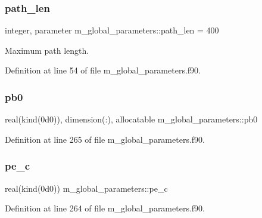 \mbox{\label{namespacem__global__parameters_aa9d578c318044b2f2ec990b5fc0dfab9}} 
\subsubsection{\texorpdfstring{path\+\_\+len}{path\_len}}
{\footnotesize\ttfamily integer, parameter m\+\_\+global\+\_\+parameters\+::path\+\_\+len = 400}



Maximum path length. 



Definition at line 54 of file m\+\_\+global\+\_\+parameters.\+f90.

\mbox{\label{namespacem__global__parameters_a1097b95561b65a9035e5f9218de577f9}} 
\subsubsection{\texorpdfstring{pb0}{pb0}}
{\footnotesize\ttfamily real(kind(0d0)), dimension(\+:), allocatable m\+\_\+global\+\_\+parameters\+::pb0}



Definition at line 265 of file m\+\_\+global\+\_\+parameters.\+f90.

\mbox{\label{namespacem__global__parameters_ac1375e5145e018847d9025e83e58b49d}} 
\subsubsection{\texorpdfstring{pe\+\_\+c}{pe\_c}}
{\footnotesize\ttfamily real(kind(0d0)) m\+\_\+global\+\_\+parameters\+::pe\+\_\+c}



Definition at line 264 of file m\+\_\+global\+\_\+parameters.\+f90.


